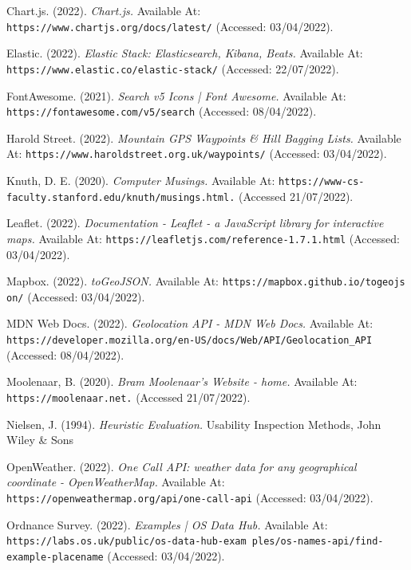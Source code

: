 \documentclass[11pt, english]{article}
\begin{document}
	\begin{thebibliography}{9}

	\bibitem{}
		Chart.js. (2022).
		\textsl{Chart.js.}
		Available At:
		\texttt{https://www.chartjs.org/docs/latest/}
		(Accessed: 03/04/2022).

	\bibitem{}
		Elastic. (2022).
		\textsl{Elastic Stack: Elasticsearch, Kibana, Beats.}
		Available At:
		\texttt{https://www.elastic.co/elastic-stack/}
		(Accessed: 22/07/2022).

	\bibitem{}
		FontAwesome. (2021).
		\textsl{Search v5 Icons | Font Awesome.}
		Available At:
		\texttt{https://fontawesome.com/v5/search}
		(Accessed: 08/04/2022).

	\bibitem{}
		Harold Street. (2022).
		\textsl{Mountain GPS Waypoints \& Hill Bagging Lists.}
		Available At:
		\texttt{https://www.haroldstreet.org.uk/waypoints/}
		(Accessed: 03/04/2022).

	\bibitem{}
		Knuth, D. E. (2020).
		\textsl{Computer Musings.}
		Available At:
		\texttt{https://www-cs-faculty.stanford.edu/knuth/musings.html.}
		(Accessed 21/07/2022).

	\bibitem{}
		Leaflet. (2022).
		\textsl{Documentation - Leaflet - a JavaScript library for interactive maps.}
		Available At:
		\texttt{https://leafletjs.com/reference-1.7.1.html}
		(Accessed: 03/04/2022).

	\bibitem{}
		Mapbox. (2022).
		\textsl{toGeoJSON.}
		Available At:
		\texttt{https://mapbox.github.io/togeojs on/}
		(Accessed: 03/04/2022).

	\bibitem{}
		MDN Web Docs. (2022).
		\textsl{Geolocation API - MDN Web Docs.}
		Available At:
		\texttt{https://developer.mozilla.org/en-US/docs/Web/API/Geolocation\_API}
		(Accessed: 08/04/2022).

	\bibitem{}
		Moolenaar, B. (2020).
		\textsl{Bram Moolenaar's Website - home.}
		Available At:
		\texttt{https://moolenaar.net.}
		(Accessed 21/07/2022).

	\bibitem{}
		Nielsen, J. (1994).
		\textsl{Heuristic Evaluation.}
		Usability Inspection Methods, John Wiley \& Sons

	\bibitem{}
		OpenWeather. (2022).
		\textsl{One Call API: weather data for any geographical coordinate - OpenWeatherMap.}
		Available At:
		\texttt{https://openweathermap.org/api/one-call-api}
		(Accessed: 03/04/2022).

	\bibitem{}
		Ordnance Survey. (2022).
		\textsl{Examples | OS Data Hub.}
		Available At:
		\texttt{https://labs.os.uk/public/os-data-hub-exam ples/os-names-api/find-example-placename}
		(Accessed: 03/04/2022).


\end{thebibliography}
\end{document}
